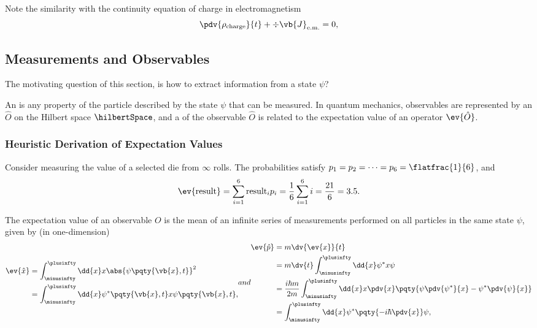 \small

Note the similarity with the continuity equation of charge in electromagnetism
\begin{equation}
    \pdv{\rho_{\text{charge}}}{t} + \div \vb{J}_{\text{e.m.}} = 0,
\end{equation}

\normalsize

\subsection{Measurements and Observables}

The motivating question of this section, is how to extract information from a state \(\psi\)?

\begin{definition}
    An  is any property of the particle described by the state \(\psi\) that can be measured. In quantum mechanics, observables are represented by an  \(\hat{O}\) on the Hilbert space \(\hilbertSpace\), and a  of the observable \(\hat{O}\) is related to the expectation value of an operator \(\ev{\hat{O}}\).
\end{definition}

\subsubsection{Heuristic Derivation of Expectation Values}

Consider measuring the value of a selected die from \(\infty\) rolls. The probabilities satisfy \(p_1 = p_2 = \cdots = p_6 = \flatfrac{1}{6}\), and
\begin{equation}
    \ev{\text{result}} = \sum_{i = 1}^{6} \text{result}_i p_i = \frac{1}{6} \sum_{i = 1}^{6} i = \frac{21}{6} = 3.5.
\end{equation}

The expectation value of an observable \(O\) is the mean of an infinite series of measurements performed on all particles in the same state \(\psi\), given by (in one-dimension)
\begin{subequations}
    \begin{align}
        \ev{\hat{x}} &= \int_{\minusinfty}^{\plusinfty} \dd{x} x \abs{\psi\pqty{\vb{x}, t}}^2 \\
        &= \int_{\minusinfty}^{\plusinfty} \dd{x} \psi^{\ast} \pqty{\vb{x}, t} x \psi\pqty{\vb{x}, t},
    \end{align}
    and
    \begin{align}
        \ev{\hat{p}} &= m \dv{\ev{x}}{t} \\
        &= m \dv{t} \int_{\minusinfty}^{\plusinfty} \dd{x} \psi^{\ast} x \psi \\
        &= \frac{i \hbar m}{2m} \int_{\minusinfty}^{\plusinfty} \dd{x}x \pdv{x} \pqty{\psi \pdv{\psi^{\ast}}{x} - \psi^{\ast} \pdv{\psi}{x}} \\
        &= \int_{\minusinfty}^{\plusinfty} \dd{x} \psi^{\ast} \pqty{- i \hbar \pdv{x}} \psi,
    \end{align}
\end{subequations}


